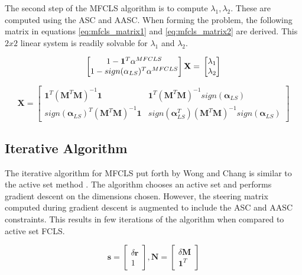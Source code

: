 \documentclass[journal]{IEEEtran}
\begin{document}
The second step of the MFCLS algorithm is to compute \(\lambda_1, \lambda_2\). These are computed using the ASC and AASC. When forming the problem, the following matrix in equations \ref{eq:mfcls_matrix1} and \ref{eq:mfcls_matrix2} are derived. This \(2x2\) linear system is readily solvable for \(\lambda_1\) and \(\lambda_2\).

\begin{equation}
\label{eq:mfcls_matrix1}
\begin{bmatrix}
1-\mathbf{1}^T\mathbf{\alpha}^{MFCLS} \\
1-sign(\mathbf{\alpha}_{LS})^T\mathbf{\alpha}^{MFCLS}
\end{bmatrix}
\mathbf{X} = \\
\begin{bmatrix}
\lambda_1 \\ \lambda_2
\end{bmatrix}
\end{equation}

\begin{equation}
\label{eq:mfcls_matrix2}
\mathbf{X} = \begin{bmatrix}
\mathbf{1}^T(\mathbf{M}^T\mathbf{M})^{-1}\mathbf{1} & \mathbf{1}^T(\mathbf{M}^T\mathbf{M})^{-1} sign(\mathbf{\alpha}_{LS}) \\
sign(\mathbf{\alpha}_{LS})^T(\mathbf{M}^T\mathbf{M})^{-1}\mathbf{1} & sign(\mathbf{\alpha}_{LS}^T) (\mathbf{M}^T\mathbf{M})^{-1} sign(\mathbf{\alpha}_{LS})
\end{bmatrix}
\end{equation}

\subsection{Iterative Algorithm}
The iterative algorithm for MFCLS put forth by Wong and Chang is similar to the active set method \cite{wong}. The algorithm chooses an active set and performs gradient descent on the dimensions chosen. However, the steering matrix computed during gradient descent is augmented to include the ASC and AASC constraints. This results in few iterations of the algorithm when compared to active set FCLS.

\begin{equation}
\mathbf{s} = \begin{bmatrix}
\delta\mathbf{r} \\ 1
\end{bmatrix},
\mathbf{N} = \begin{bmatrix}
\delta \mathbf{M} \\ \mathbf{1}^T
\end{bmatrix}
\end{equation}
\end{document}
